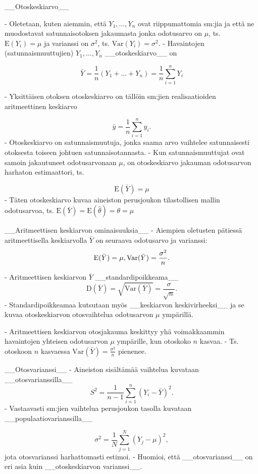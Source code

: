 \documentclass[
]{book}
\begin{document}
\begin{itemize}
__Otoskeskiarvo__

- Oletetaan, kuten aiemmin, että $Y_1,\ldots,Y_n$ ovat riippumattomia sm:jia ja että ne muodostavat satunnaisotoksen jakaumasta jonka odotusarvo on $\mu$, ts. $\text{E}(Y_i) = \mu$ ja varianssi on $\sigma^2$, ts. $\text{Var}(Y_i) = \sigma^2$. 
  - Havaintojen (satunnaismuuttujien) $Y_1, \ldots, Y_n$ __otoskeskiarvo__ on  

$$
\bar{Y} = \frac{1}{n}(Y_1 + \ldots + Y_n) = \frac{1}{n} \sum_{i=1}^{n} Y_i
$$

  - Yksittäisen otoksen otoskeskiarvo on tällöin sm:jien realisaatioiden aritmeettinen keskiarvo

$$
\bar{y} = \frac{1}{n} \sum_{i=1}^{n} y_i.
$$
    - Otoskeskiarvo on satunnaismuutuja, jonka saama arvo vaihtelee satunnaisesti otoksesta toiseen johtuen satunnaisotannasta.
    - Kun satunnaismuuttujat ovat samoin jakautuneet odotusarvonaan $\mu$, on otoskeskiarvo jakauman odotusarvon harhaton estimaattori, ts. 

$$\text{E}(\bar{Y}) = \mu$$
    - Täten otoskeskiarvo kuvaa aineiston perusjoukon tilastollisen mallin odotusarvoa, ts. $\text{E}(\bar{Y}) = \text{E}(\widehat{\theta}) = \theta = \mu$

__Aritmeettisen keskiarvon ominaisuuksia__
- Aiempien oletusten pätiessä aritmeettisella keskiarvolla $\bar{Y}$ on seuraava odotusarvo ja varianssi:
$$
\text{E}(\bar{Y}) = \mu,  \\
\mathrm{Var}(\bar{Y}) = \frac{\sigma^2}{n}.
$$

- Aritmeettisen keskiarvon $\bar{Y}$ __standardipoikkeama__
$$
\text{D}(\bar{Y}) = \sqrt{\mathrm{Var}(\bar{Y})} = \frac{\sigma}{\sqrt{n}}.
$$
- Standardipoikkeamaa kutsutaan myös __keskiarvon keskivirheeksi__ ja se kuvaa otoskeskiarvon otosvaihtelua odotusarvon $\mu$ ympärillä.

- Aritmeettisen keskiarvon otosjakauma keskittyy yhä voimakkaammin havaintojen yhteisen odotusarvon $\mu$ ympärille, kun otoskoko $n$ kasvaa. 
  - Ts. otoskoon $n$ kasvaessa $\mathrm{Var}(\bar{Y}) = \frac{\sigma^2}{n}$ pienenee.

__Otosvarianssi__
- Aineiston sisältämää vaihtelua kuvataan __otosvarianssilla__
$$
S^2= \frac{1}{n-1} \sum_{i=1}^{n} (Y_i - \bar{Y})^2.
$$
  - Vastaavasti sm:jien vaihtelua perusjoukon tasolla kuvataan __populaatiovarianssilla__

$$
\sigma^2= \frac{1}{N} \sum_{j=1}^{N} (Y_j - \mu)^2,
$$
jota otosvarianssi harhattomasti estimoi.
- Huomioi, että __otosvarianssi__ on eri asia kuin __otoskeskiarvon varianssi__.


\end{itemize}
\end{document}
